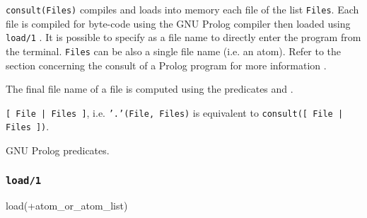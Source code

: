 \Description

\texttt{consult(Files)} compiles and loads into memory each file
of the list \texttt{Files}. Each file is compiled for byte-code using the
GNU Prolog compiler  then loaded using
\texttt{load/1} . It is possible to specify  as a
file name to directly enter the program from the terminal. \texttt{Files} can
be also a single file name (i.e. an atom). Refer to the section concerning
the consult of a Prolog program for more information
.

The final file name of a file is computed using the predicates
  and
 .

\texttt{[ File | Files ]}, i.e. \texttt{'.'(File, Files)} is
equivalent to \texttt{consult([ File | Files ])}.

\begin{PlErrors}







\end{PlErrors}

\Portability

GNU Prolog predicates.

\subsubsection{\texttt{load/1}}
\label{load/1}

\begin{TemplatesOneCol}
load(+atom\_or\_atom\_list)

\end{TemplatesOneCol}

